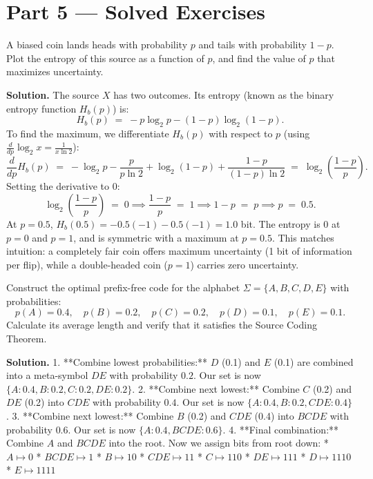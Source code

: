 \newpage

\section{Part 5 \texorpdfstring{---}{--} Solved Exercises}

\begin{exercise}
A biased coin lands heads with probability $p$ and tails with probability $1-p$. Plot the entropy of this source as a function of $p$, and find the value of $p$ that maximizes uncertainty.
\end{exercise}

\textbf{Solution.}
The source $X$ has two outcomes. Its entropy (known as the binary entropy function $H_b(p)$) is:
\[
  H_b(p) \;=\; -p \log_2 p - (1-p) \log_2 (1-p).
\]
To find the maximum, we differentiate $H_b(p)$ with respect to $p$ (using $\frac{d}{dp}\log_2 x = \frac{1}{x \ln 2}$):
\[
  \frac{d}{dp} H_b(p) \;=\; -\log_2 p - \frac{p}{p \ln 2} + \log_2(1-p) + \frac{1-p}{(1-p)\ln 2} \;=\; \log_2 \left(\frac{1-p}{p}\right).
\]
Setting the derivative to 0:
\[
  \log_2 \left(\frac{1-p}{p}\right) \;=\; 0 \implies \frac{1-p}{p} \;=\; 1 \implies 1-p \;=\; p \implies p \;=\; 0.5.
\]
At $p = 0.5$, $H_b(0.5) = -0.5(-1) - 0.5(-1) = 1.0$ bit. The entropy is 0 at $p=0$ and $p=1$, and is symmetric with a maximum at $p=0.5$. This matches intuition: a completely fair coin offers maximum uncertainty (1 bit of information per flip), while a double-headed coin ($p=1$) carries zero uncertainty.

\begin{exercise}
Construct the optimal prefix-free code for the alphabet $\Sigma = \{A, B, C, D, E\}$ with probabilities:
\[
  p(A) = 0.4, \quad p(B) = 0.2, \quad p(C) = 0.2, \quad p(D) = 0.1, \quad p(E) = 0.1.
\]
Calculate its average length and verify that it satisfies the Source Coding Theorem.
\end{exercise}

\textbf{Solution.}
1. **Combine lowest probabilities:** $D$ (0.1) and $E$ (0.1) are combined into a meta-symbol $DE$ with probability $0.2$. Our set is now $\{A: 0.4, B: 0.2, C: 0.2, DE: 0.2\}$.
2. **Combine next lowest:** Combine $C$ (0.2) and $DE$ (0.2) into $CDE$ with probability $0.4$. Our set is now $\{A: 0.4, B: 0.2, CDE: 0.4\}$.
3. **Combine next lowest:** Combine $B$ (0.2) and $CDE$ (0.4) into $BCDE$ with probability $0.6$. Our set is now $\{A: 0.4, BCDE: 0.6\}$.
4. **Final combination:** Combine $A$ and $BCDE$ into the root.
Now we assign bits from root down:
* $A \mapsto 0$
* $BCDE \mapsto 1$
  * $B \mapsto 10$
  * $CDE \mapsto 11$
    * $C \mapsto 110$
    * $DE \mapsto 111$
      * $D \mapsto 1110$
      * $E \mapsto 1111$

